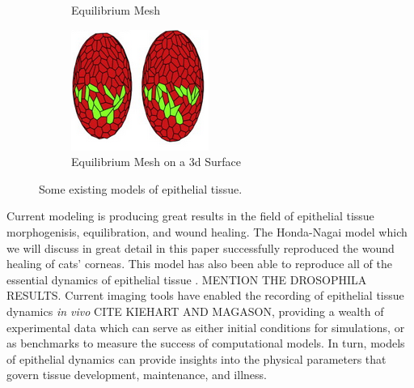 \begin{figure}[h]
\begin{subfigure}[b]{0.4\textwidth}
        \caption{Equilibrium Mesh\cite{HondaNagai}}
        \label{fig:Honda}
    \end{subfigure}
    \hfill
    \begin{subfigure}[b]{0.4\textwidth}
        \centering
        \includegraphics[width=\textwidth]{../diagrams/mirim.png}
        \caption{Equilibrium Mesh on a 3d Surface \cite{Vertex Models}}
        \label{fig:mirim}
    \end{subfigure}
    \caption{Some existing models of epithelial tissue.}
    \label{fig:four graphs}
\end{figure}


Current modeling is producing great results in the field of epithelial tissue morphogenisis, equilibration, and wound healing. The Honda-Nagai model which we will discuss in great detail in this paper successfully reproduced the wound healing of cats' corneas\cite{Wound Healing}. This model has also been able to reproduce all of the essential dynamics of epithelial tissue \cite{HondaNagai}. MENTION THE DROSOPHILA RESULTS. Current imaging tools have enabled the recording of epithelial tissue dynamics \emph{in vivo} CITE KIEHART AND MAGASON, providing a wealth of experimental data which can serve as either initial conditions for simulations, or as benchmarks to measure the success of computational models. In turn, models of epithelial dynamics can provide insights into the physical parameters that govern tissue development, maintenance, and illness.


